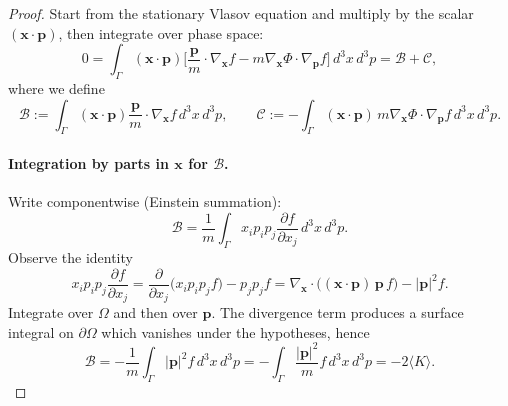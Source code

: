 \documentclass[10pt,a4paper]{amsart}
\begin{document}
\begin{proof}
Start from the stationary Vlasov equation and multiply by the scalar $(\mathbf{x}\!\cdot\!\mathbf{p})$, then integrate over phase space:
\begin{equation}
0
= \int_{\Gamma} (\mathbf{x}\!\cdot\!\mathbf{p})\Big[\frac{\mathbf{p}}{m}\!\cdot\!\nabla_{\mathbf{x}} f - m\nabla_{\mathbf{x}}\Phi\!\cdot\!\nabla_{\mathbf{p}} f\Big]\,d^3x\,d^3p
= \mathscr{B} + \mathscr{C},
\end{equation}
where we define
\begin{equation}
\mathscr{B} := \int_{\Gamma} (\mathbf{x}\!\cdot\!\mathbf{p})\frac{\mathbf{p}}{m}\!\cdot\!\nabla_{\mathbf{x}} f\,d^3x\,d^3p,
\qquad
\mathscr{C} := -\int_{\Gamma} (\mathbf{x}\!\cdot\!\mathbf{p})\,m\nabla_{\mathbf{x}}\Phi\!\cdot\!\nabla_{\mathbf{p}} f\,d^3x\,d^3p.
\end{equation}

\paragraph{Integration by parts in \(\mathbf{x}\) for \(\mathscr{B}\).}
Write componentwise (Einstein summation):
\begin{equation}
\mathscr{B} = \frac{1}{m}\int_{\Gamma} x_i p_i p_j \frac{\partial f}{\partial x_j}\,d^3x\,d^3p.
\end{equation}
Observe the identity
\begin{equation}
x_i p_i p_j \frac{\partial f}{\partial x_j}
= \frac{\partial}{\partial x_j}\big(x_i p_i p_j f\big) - p_j p_j f
= \nabla_{\mathbf{x}}\!\cdot\!\big( (\mathbf{x}\!\cdot\!\mathbf{p})\,\mathbf{p}\, f \big) - |\mathbf{p}|^2 f.
\end{equation}
Integrate over \(\Omega\) and then over \(\mathbf{p}\). The divergence term produces a surface integral on \(\partial\Omega\) which vanishes under the hypotheses, hence
\begin{equation}
\mathscr{B} = -\frac{1}{m}\int_{\Gamma} |\mathbf{p}|^2 f\,d^3x\,d^3p
= -\int_{\Gamma}\frac{|\mathbf{p}|^2}{m} f\,d^3x\,d^3p
= -2\langle {K}\rangle.
\end{equation}


\end{proof}
\end{document}
